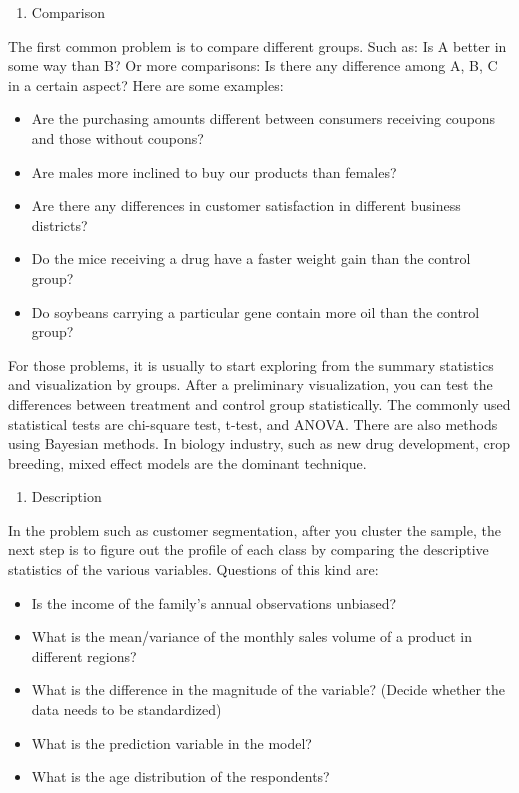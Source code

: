 \documentclass[12pt,]{krantz}
\providecommand{\tightlist}{%
  \setlength{\itemsep}{0pt}\setlength{\parskip}{0pt}}
\theoremstyle{definition}
\theoremstyle{definition}
\theoremstyle{remark}
\begin{document}
\begin{enumerate}
\def\labelenumi{\arabic{enumi}.}
\tightlist
\item
  Comparison
\end{enumerate}

The first common problem is to compare different groups. Such as: Is A
better in some way than B? Or more comparisons: Is there any difference
among A, B, C in a certain aspect? Here are some examples:

\begin{itemize}
\tightlist
\item
  Are the purchasing amounts different between consumers receiving
  coupons and those without coupons?
\item
  Are males more inclined to buy our products than females?
\item
  Are there any differences in customer satisfaction in different
  business districts?
\item
  Do the mice receiving a drug have a faster weight gain than the
  control group?
\item
  Do soybeans carrying a particular gene contain more oil than the
  control group?
\end{itemize}

For those problems, it is usually to start exploring from the summary
statistics and visualization by groups. After a preliminary
visualization, you can test the differences between treatment and
control group statistically. The commonly used statistical tests are
chi-square test, t-test, and ANOVA. There are also methods using
Bayesian methods. In biology industry, such as new drug development,
crop breeding, mixed effect models are the dominant technique.

\begin{enumerate}
\def\labelenumi{\arabic{enumi}.}
\setcounter{enumi}{1}
\tightlist
\item
  Description
\end{enumerate}

In the problem such as customer segmentation, after you cluster the
sample, the next step is to figure out the profile of each class by
comparing the descriptive statistics of the various variables. Questions
of this kind are:

\begin{itemize}
\tightlist
\item
  Is the income of the family's annual observations unbiased?
\item
  What is the mean/variance of the monthly sales volume of a product in
  different regions?
\item
  What is the difference in the magnitude of the variable? (Decide
  whether the data needs to be standardized)
\item
  What is the prediction variable in the model?
\item
  What is the age distribution of the respondents?
\end{itemize}
\end{document}
